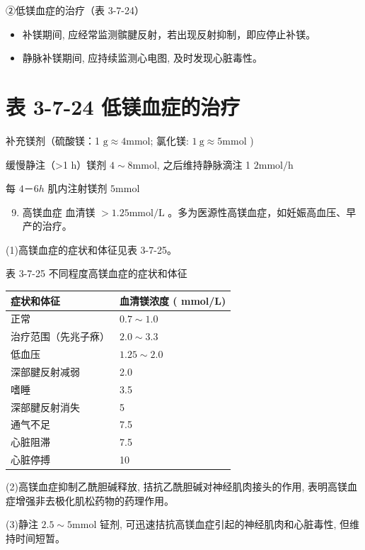 \documentclass[10pt]{article}
\begin{document}
②低镁血症的治疗（表 3-7-24）

\begin{itemize}
  \item 补镁期间, 应经常监测髌腱反射，若出现反射抑制，即应停止补镁。
  \item 静脉补镁期间, 应持续监测心电图, 及时发现心脏毒性。
\end{itemize}

\section*{表 3-7-24 低镁血症的治疗}
补充镁剂（硫酸镁：1 $\mathrm{g} \approx 4 \mathrm{mmol}$; 氯化镁: $1 \mathrm{~g} \approx 5 \mathrm{mmol}$ )

缓慢静注（>1 h）镁剂 $4 \sim 8 \mathrm{mmol}$, 之后维持静脉滴注 1 $2 \mathrm{mmol} / \mathrm{h}$

每 $4 － 6 h$ 肌内注射镁剂 $5 \mathrm{mmol}$

\begin{enumerate}
  \setcounter{enumi}{8}
  \item 高镁血症 血清镁 $>1.25 \mathrm{mmol} / \mathrm{L}$ 。多为医源性高镁血症，如妊娠高血压、早产的治疗。
\end{enumerate}

(1)高镁血症的症状和体征见表 3-7-25。

表 3-7-25 不同程度高镁血症的症状和体征

\begin{center}
\begin{tabular}{ll}
\hline
症状和体征 & 血清镁浓度 ( mmol/L) \\
\hline
正常 & $0.7 \sim 1.0$ \\
治疗范围（先兆子㾋） & $2.0 \sim 3.3$ \\
低血压 & $1.25 \sim 2.0$ \\
深部腱反射减弱 & 2.0 \\
嗜睡 & 3.5 \\
深部腱反射消失 & 5 \\
通气不足 & 7.5 \\
心脏阻滞 & 7.5 \\
心脏停搏 & 10 \\
\hline
\end{tabular}
\end{center}

(2)高镁血症抑制乙酰胆碱释放, 拮抗乙酰胆碱对神经肌肉接头的作用, 表明高镁血症增强非去极化肌松药物的药理作用。

(3)静注 $2.5 \sim 5 \mathrm{mmol}$ 钲剂, 可迅速拮抗高镁血症引起的神经肌肉和心脏毒性, 但维持时间短暂。
\end{document}
